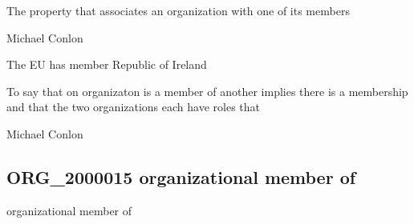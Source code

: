 \documentclass[letterpaper,10pt,english]{sphinxmanual}
\begin{document}
\begin{sphinxShadowBox}

\sphinxAtStartPar
The property that associates an organization with one of its members
\end{sphinxShadowBox}

\begin{sphinxShadowBox}

\sphinxAtStartPar
Michael Conlon 
\end{sphinxShadowBox}

\begin{sphinxShadowBox}

\sphinxAtStartPar
The EU has member Republic of Ireland
\end{sphinxShadowBox}

\begin{sphinxShadowBox}

\sphinxAtStartPar
To say that on organizaton is a member of another implies there is a membership and that the two organizations each have  roles that
\end{sphinxShadowBox}

\begin{sphinxShadowBox}

\sphinxAtStartPar
Michael Conlon 
\end{sphinxShadowBox}
\begin{quote}

\ignorespaces \end{quote}


\subsection{ORG\_2000015 \sphinxhyphen{} organizational member of}
\label{\detokenize{doc-ORG_2000015:org-2000015-organizational-member-of}}\label{\detokenize{doc-ORG_2000015:index-0}}\label{\detokenize{doc-ORG_2000015::doc}}
\begin{sphinxShadowBox}

\sphinxAtStartPar
organizational member of
\end{sphinxShadowBox}
\end{document}
